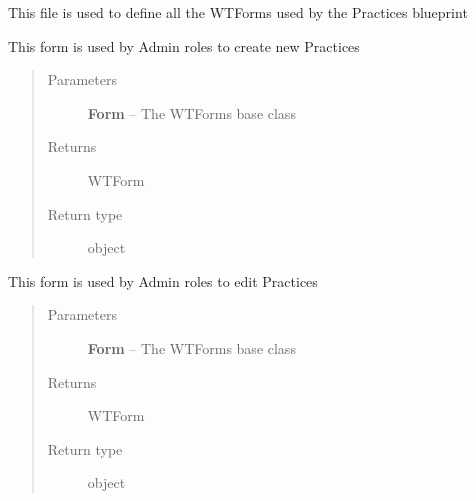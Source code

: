 \documentclass[letterpaper,10pt,english]{sphinxmanual}
\begin{document}
This file is used to define all the WTForms used by the Practices blueprint

\begin{fulllineitems}
\label{dev-evaluations:cagenix.evaluations.forms.PracticeCreateForm}
This form is used by Admin roles to create new Practices
\begin{quote}\begin{description}
\item[{Parameters}] \leavevmode
\textbf{Form} -- The WTForms base class

\item[{Returns}] \leavevmode
WTForm

\item[{Return type}] \leavevmode
object

\end{description}\end{quote}

\end{fulllineitems}


\begin{fulllineitems}
\label{dev-evaluations:cagenix.evaluations.forms.PracticeEditForm}
This form is used by Admin roles to edit Practices
\begin{quote}\begin{description}
\item[{Parameters}] \leavevmode
\textbf{Form} -- The WTForms base class

\item[{Returns}] \leavevmode
WTForm

\item[{Return type}] \leavevmode
object

\end{description}\end{quote}

\end{fulllineitems}
\end{document}
